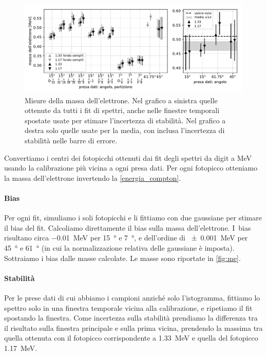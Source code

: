 \begin{figure}
	\hspace{-7em}\includegraphics[width=50em]{me}
	\caption{\label{fig:me}
	Misure della massa dell'elettrone.
	Nel grafico a sinistra quelle ottenute da tutti i fit di spettri,
	anche nelle finestre temporali spostate usate per stimare l'incertezza di stabilità.
	Nel grafico a destra solo quelle usate per la media,
	con inclusa l'incertezza di stabilità nelle barre di errore.}
\end{figure}

Convertiamo i centri dei fotopicchi ottenuti dai fit degli spettri
da digit a MeV usando la calibrazione più vicina a ogni presa dati.
Per ogni fotopicco otteniamo la massa dell'elettrone invertendo la \eqref{energia_compton}.

\paragraph{Bias}

Per ogni fit, simuliamo i soli fotopicchi e li fittiamo con due gaussiane
per stimare il bias del fit. Calcoliamo direttamente il bias sulla massa dell'elettrone.
I~bias risultano circa \SI{-0.01}{MeV} per \SI{15}{\degree} e \SI{7}{\degree},
e dell'ordine di \SI{\pm0.001}{MeV} per \SI{45}{\degree} e \SI{61}{\degree}
(in cui la normalizzazione relativa delle gaussiane è imposta).
Sottraiamo i bias dalle masse calcolate.
Le masse sono riportate in \autoref{fig:me}.

\paragraph{Stabilità}

Per le prese dati di cui abbiamo i campioni anziché solo l'istogramma,
fittiamo lo spettro solo in una finestra temporale vicina alla calibrazione,
e ripetiamo il fit spostando la finestra.
Come incertezza sulla stabilità prendiamo la differenza
tra il risultato sulla finestra principale e sulla prima vicina,
prendendo la massima tra quella ottenuta con il fotopicco corrispondente a \SI{1.33}{MeV}
e quella del fotopicco \SI{1.17}{MeV}.

